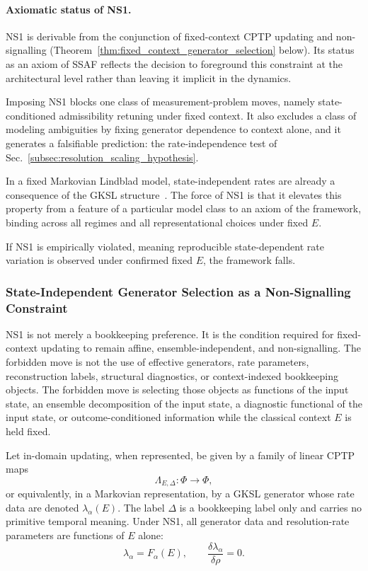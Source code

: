 \documentclass[aps,prx,onecolumn,11pt]{revtex4-2}
\theoremstyle{plain}
\theoremstyle{definition}
\theoremstyle{remark}
\begin{document}
\paragraph{Axiomatic status of NS1.}

NS1 is derivable from the conjunction of fixed-context CPTP updating and
non-signalling (Theorem~\ref{thm:fixed_context_generator_selection}
below). Its status as an axiom of SSAF reflects the decision to
foreground this constraint at the architectural level rather than
leaving it implicit in the dynamics.

Imposing NS1 blocks one class of measurement-problem moves, namely
state-conditioned admissibility retuning under fixed context. It also
excludes a class of modeling ambiguities by fixing generator dependence
to context alone, and it generates a falsifiable prediction: the
rate-independence test of Sec.~\ref{subsec:resolution_scaling_hypothesis}.

In a fixed Markovian Lindblad model, state-independent rates are already
a consequence of the GKSL structure~\cite{Gorini1976,Lindblad1976}.
The force of NS1 is that it elevates this property from a feature of a
particular model class to an axiom of the framework, binding across all
regimes and all representational choices under fixed \(E\).

If NS1 is empirically violated, meaning reproducible state-dependent
rate variation is observed under confirmed fixed \(E\), the framework
falls.

\subsubsection{State-Independent Generator Selection as a Non-Signalling Constraint}
\label{sec:state_independent_generator_selection}

NS1 is not merely a bookkeeping preference. It is the condition required
for fixed-context updating to remain affine, ensemble-independent, and
non-signalling. The forbidden move is not the use of effective
generators, rate parameters, reconstruction labels, structural
diagnostics, or context-indexed bookkeeping objects. The forbidden move
is selecting those objects as functions of the input state, an ensemble
decomposition of the input state, a diagnostic functional of the input
state, or outcome-conditioned information while the classical context
\(E\) is held fixed.

Let in-domain updating, when represented, be given by a family of linear
CPTP maps
\[
\Lambda_{E,\Delta}:\Phi\to\Phi,
\]
or equivalently, in a Markovian representation, by a GKSL generator
whose rate data are denoted \(\lambda_\alpha(E)\). The label
\(\Delta\) is a bookkeeping label only and carries no primitive temporal
meaning. Under NS1, all generator data and resolution-rate parameters
are functions of \(E\) alone:
\[
\lambda_\alpha = F_\alpha(E),
\qquad
\frac{\delta\lambda_\alpha}{\delta\rho}=0.
\]
\end{document}
